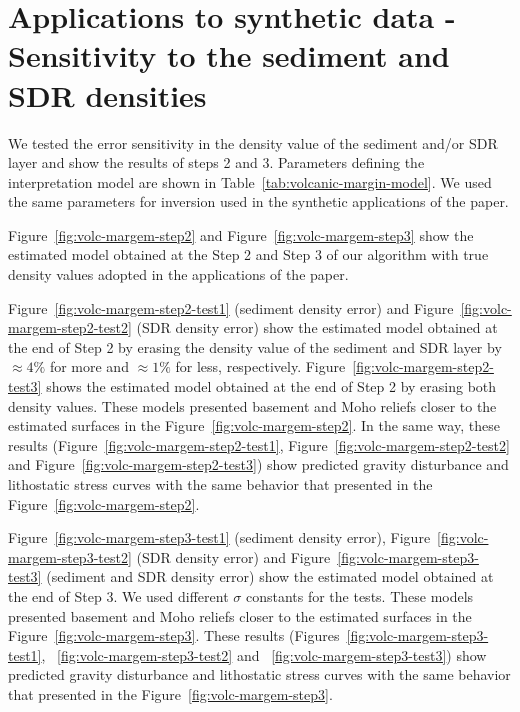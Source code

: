\documentclass[manuscript]{geophysics}
\begin{document}
\section{Applications to synthetic data - Sensitivity to the sediment and SDR densities}

We tested the error sensitivity in the density value of the sediment and/or SDR layer and show the results of steps 2 and 3. Parameters defining the interpretation model are shown in Table~\ref{tab:volcanic-margin-model}.  We used the same parameters for inversion used in the synthetic applications of the paper.

Figure~\ref{fig:volc-margem-step2} and Figure~\ref{fig:volc-margem-step3} show the estimated model obtained at the Step 2 and Step 3 of our algorithm with true density values adopted in the applications of the paper. 

Figure~\ref{fig:volc-margem-step2-test1} (sediment density error) and Figure~\ref{fig:volc-margem-step2-test2} (SDR density error) show the estimated model obtained at the end of Step 2 by erasing the density value of the sediment and SDR layer by $\approx 4\%$ for more and  $\approx 1\%$ for less, respectively. Figure~\ref{fig:volc-margem-step2-test3} shows the estimated model obtained at the end of Step 2 by erasing both density values. These models presented basement and Moho reliefs closer to the estimated surfaces in the Figure~\ref{fig:volc-margem-step2}. In the same way, these results (Figure~\ref{fig:volc-margem-step2-test1}, Figure~\ref{fig:volc-margem-step2-test2} and Figure~\ref{fig:volc-margem-step2-test3}) show predicted gravity disturbance and lithostatic stress curves with the same behavior that presented in the Figure~\ref{fig:volc-margem-step2}. 

Figure~\ref{fig:volc-margem-step3-test1} (sediment density error), Figure~\ref{fig:volc-margem-step3-test2} (SDR density error) and Figure~\ref{fig:volc-margem-step3-test3} (sediment and SDR density error) show the estimated model obtained at the end of Step 3. We used different $\sigma$ constants for the tests. These models presented basement and Moho reliefs closer to the estimated surfaces in the Figure~\ref{fig:volc-margem-step3}. These results (Figures~\ref{fig:volc-margem-step3-test1},  ~\ref{fig:volc-margem-step3-test2} and ~\ref{fig:volc-margem-step3-test3}) show predicted gravity disturbance and lithostatic stress curves with the same behavior that presented in the Figure~\ref{fig:volc-margem-step3}. 
\end{document}
